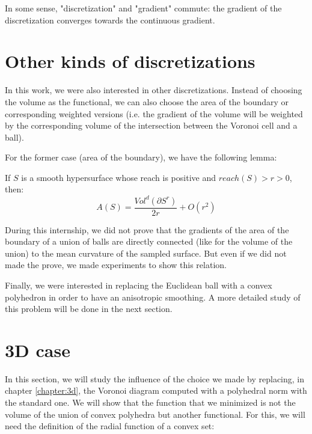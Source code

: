 In some sense, "discretization" and "gradient" commute: the gradient of the
discretization converges towards the continuous gradient.

\section{Other kinds of discretizations}


In this work, we were also interested in other discretizations. Instead of
choosing the volume as the functional, we can also choose the area of the
boundary or corresponding weighted versions (i.e. the gradient of the volume
will be weighted by the corresponding volume of the intersection between the
Voronoi cell and a ball).

For the former case (area of the boundary), we have the following lemma:
\begin{lemma}
    If $ S $ is a smooth hypersurface whose reach is positive and $ reach(S) > r
    > 0 $, then:
    \begin{equation}
        A(S) = \frac{Vol^d(\partial S^r)}{2r} + O(r^2)
    \end{equation}
\end{lemma}

During this internship, we did not prove that the gradients of the area of the
boundary of a union of balls are directly connected (like for the volume of the
union) to the mean curvature of the sampled surface. But even if we did not
made the prove, we made experiments to show this relation.

Finally, we were interested in replacing the Euclidean ball with a convex
polyhedron in order to have an anisotropic smoothing. A more detailed study of
this problem will be done in the next section.

\section{3D case}
\label{sec:theory-3d-case}

In this section, we will study the influence of the choice we made by replacing,
in chapter \ref{chapter:3d}, the Voronoi diagram computed with a polyhedral norm
with the standard one. We will show that the function that we minimized is not
the volume of the union of convex polyhedra but another functional. For this, we
will need the definition of the radial function of a convex set:

